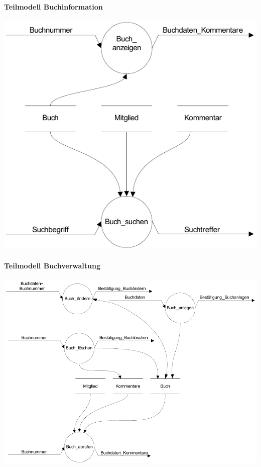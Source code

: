 \paragraph{Teilmodell Buchinformation}
\includegraphics[scale=1.0]{teilmodell_buchinformation}

\paragraph{Teilmodell Buchverwaltung}
\includegraphics[scale=0.85]{teilmodell_buchverwaltung}

